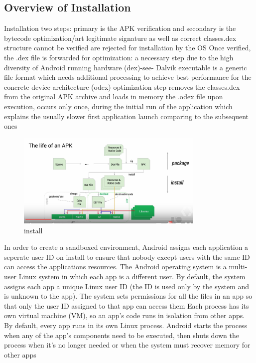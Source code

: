 \subsection{Overview of Installation} \label{subsection:android-install}

Installation two steps:  primary is the APK verification and secondary is the bytecode optimization/art\newline
legitimate signature as well as correct classes.dex structure cannot be verified are rejected for installation by the OS\newline
Once verified, the .dex file is forwarded for optimization: a necessary step due to the high diversity of Android running hardware (dex)-see- Dalvik executable is a generic file format which needs additional processing to achieve best performance for the concrete device architecture (odex)\newline
optimization\newline
step removes the classes.dex from the original APK archive and loads in memory the .odex file upon execution, occurs only once, during the initial run of the application which explains the usually slower first application launch comparing to the subsequent ones\cite{kovachevaMaster}
\begin{figure}[h]
    \centering
    \includegraphics[width=0.8\textwidth]{data/install.png}
    \caption{install}
    \label{fig:install}
\end{figure}

In order to create a sandboxed environment, Android assigns each application a seperate user ID on install to ensure that nobody except users with the same ID can access the applications resources.
The Android operating system is a multi-user Linux system in which each app is a different user.
By default, the system assigns each app a unique Linux user ID (the ID is used only by the system and is unknown to the app). The system sets permissions for all the files in an app so that only the user ID assigned to that app can access them
Each process has its own virtual machine (VM), so an app's code runs in isolation from other apps.
By default, every app runs in its own Linux process. Android starts the process when any of the app's components need to be executed, then shuts down the process when it's no longer needed or when the system must recover memory for other apps\cite{developerFundamentals}

